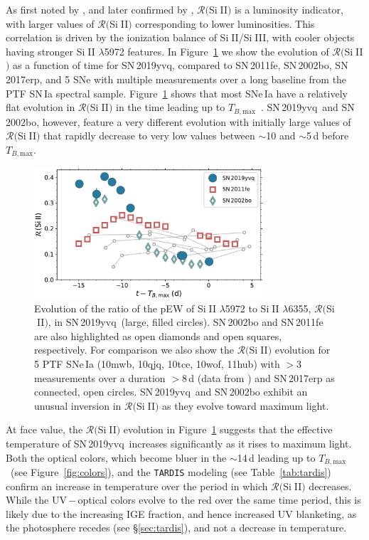 \documentclass[twocolumn]{aastex63}
\def\ion#1#2{#1$\;${\footnotesize\rm{#2}}\relax}
\newcommand{\tbmax}{$T_{B,\mathrm{max}}$}
\newcommand{\sn}{SN\,2019yvq}
\begin{document}
As first noted by \citet{Nugent95}, and later confirmed by
\citet{Hachinger08}, $\mathcal{R}($\ion{Si}{II}$)$ is a luminosity indicator,
with larger values of $\mathcal{R}($\ion{Si}{II}$)$ corresponding to lower
luminosities. This correlation is driven by the ionization balance of
\ion{Si}{II}/\ion{Si}{III}, with cooler objects having stronger \ion{Si}{II}
$\lambda$5972 features. In Figure~\ref{fig:r_evo} we show the evolution of
$\mathcal{R}($\ion{Si}{II}$)$ as a function of time for \sn, compared to
SN\,2011fe, SN\,2002bo, SN\,2017erp, and 5 SNe with multiple measurements over
a long baseline from the PTF SN\,Ia spectral sample. Figure~\ref{fig:r_evo}
shows that most SNe\,Ia have a relatively flat evolution in
$\mathcal{R}($\ion{Si}{II}$)$ in the time leading up to \tbmax\ \citep[see
also][]{Riess98a}. \sn\ and SN\,2002bo, however, feature a very different
evolution with initially large values of $\mathcal{R}($\ion{Si}{II}$)$ that
rapidly decrease to very low values between $\sim$10 and $\sim$5\,d before
\tbmax.

\begin{figure}
    \centering
    \includegraphics[width=3.35in]{./figures/R_evolution.pdf}
    \caption{Evolution of the ratio of the pEW of \ion{Si}{II} $\lambda$5972
    to \ion{Si}{II} $\lambda$6355, $\mathcal{R}($\ion{Si}{II}$)$, in \sn\
    (large, filled circles). SN\,2002bo \citep[data from][]{Benetti04} and
    SN\,2011fe \citep[data from][]{Pereira13} are also highlighted as open
    diamonds and open squares, respectively. For comparison we also show the
    $\mathcal{R}($\ion{Si}{II}$)$ evolution for 5 PTF SNe\,Ia (10mwb, 10qjq,
    10tce, 10wof, 11hub) with $> 3$ measurements over a duration $> 8$\,d
    (data from \citealt{Maguire14}) and SN\,2017erp \citep[data
    from][]{Brown19} as connected, open circles. \sn\ and SN\,2002bo exhibit
    an unusual inversion in $\mathcal{R}($\ion{Si}{II}$)$ as they evolve
    toward maximum light.}
    \label{fig:r_evo}
\end{figure}

At face value, the $\mathcal{R}($\ion{Si}{II}$)$ evolution in
Figure~\ref{fig:r_evo} suggests that the effective temperature of \sn\
increases significantly as it rises to maximum light. Both the optical colors,
which become bluer in the $\sim$14\,d leading up to \tbmax\ (see
Figure~\ref{fig:colors}), and the \texttt{TARDIS} modeling (see
Table~\ref{tab:tardis}) confirm an increase in temperature over the period in
which $\mathcal{R}($\ion{Si}{II}$)$ decreases. While the UV\,$-$\,optical
colors evolve to the red over the same time period, this is likely due to the
increasing IGE fraction, and hence increased UV blanketing, as the photosphere
recedes (see \S\ref{sec:tardis}), and not a decrease in temperature.
\end{document}
